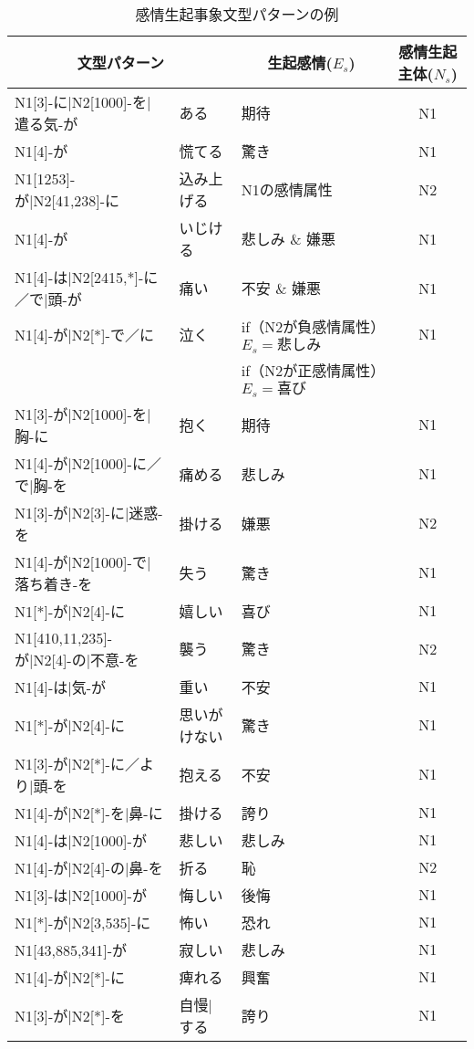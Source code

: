 \documentclass[japanese]{jnlp_1.3c}
\begin{document}
\begin{table}[t]
\begin{center}
\caption{感情生起事象文型パターンの例}
    \footnotesize\renewcommand{\baselinestretch}{}\selectfont
    \begin{tabular}{|l|l|p{3cm}|c|}
\hline
\multicolumn{2}{|c|}{文型パターン} &  \multicolumn{1}{|c|}{生起感情($E_s$)} & 感情生起主体($N_s$) \\ \hline \hline
N1[3]-に|N2[1000]-を|遣る気-が	 & 	ある	 & 	期待	&	N1	\\ \hline
N1[4]-が	 & 	慌てる	 & 	驚き	&	N1	\\ \hline
N1[1253]-が|N2[41,238]-に	&	込み上げる	&	N1の感情属性	&	N2	\\ \hline
N1[4]-が	 & 	いじける	 & 	悲しみ \& 嫌悪	&	N1	\\ \hline
N1[4]-は|N2[2415,*]-に／で|頭-が	 & 	痛い	 & 	不安 \& 嫌悪	&	N1	\\ \hline
N1[4]-が|N2[*]-で／に	&	泣く	 &	if（N2が負感情属性）$E_s = 悲しみ$  	&	N1	\\
			&		 &	if（N2が正感情属性）$E_s = 喜び$		&		\\ \hline
N1[3]-が|N2[1000]-を|胸-に	 & 	抱く	 & 	期待	&	N1	\\ \hline
N1[4]-が|N2[1000]-に／で|胸-を	 & 	痛める	 &  悲しみ	&	N1	\\ \hline
N1[3]-が|N2[3]-に|迷惑-を	&	掛ける	&	嫌悪	&	N2	\\ \hline
N1[4]-が|N2[1000]-で|落ち着き-を	 & 	失う	 & 	驚き	&	N1	\\ \hline
N1[*]-が|N2[4]-に	 & 	嬉しい	 & 	喜び	&	N1	\\ \hline
N1[410,11,235]-が|N2[4]-の|不意-を	&	襲う	&	驚き	&	N2	\\ \hline
N1[4]-は|気-が	 & 	重い	 & 	不安 	&	N1	\\ \hline
N1[*]-が|N2[4]-に	 & 	思いがけない	 & 	驚き	 &	N1	\\ \hline
N1[3]-が|N2[*]-に／より|頭-を	 & 	抱える	 & 	不安	&	N1	\\ \hline
N1[4]-が|N2[*]-を|鼻-に	 & 	掛ける	 & 	誇り	&	N1	\\ \hline
N1[4]-は|N2[1000]-が	 & 	悲しい	 & 	悲しみ	&	N1	\\ \hline
N1[4]-が|N2[4]-の|鼻-を	&	折る	&	恥	&	N2	\\ \hline	
N1[3]-は|N2[1000]-が	 & 	悔しい	 & 	後悔	&	N1	\\ \hline
N1[*]-が|N2[3,535]-に	 & 	怖い	 & 	恐れ	 &	N1	\\ \hline
N1[43,885,341]-が	 & 	寂しい	 & 	悲しみ	&	N1	\\ \hline
N1[4]-が|N2[*]-に	 & 	痺れる	 & 	興奮	&	N1	\\ \hline
N1[3]-が|N2[*]-を	 & 	自慢|する	 & 	誇り	&	N1	\\ \hline
\end{tabular}
\label{tb:patterns}
\end{center}
\end{table}
\end{document}
